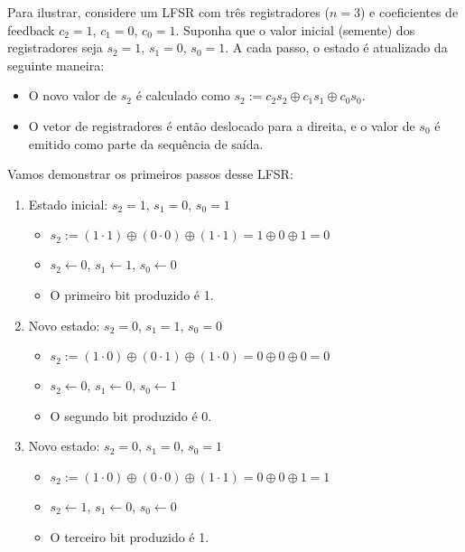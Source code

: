 \begin{example}
  Para ilustrar, considere um LFSR com três registradores ($n=3$) e coeficientes de feedback $c_2 = 1$, $c_1 = 0$, $c_0 = 1$.
  Suponha que o valor inicial (semente) dos registradores seja $s_2 = 1$, $s_1 = 0$, $s_0 = 1$.
  A cada passo, o estado é atualizado da seguinte maneira:

\begin{itemize}
    \item O novo valor de $s_2$ é calculado como $s_2 := c_2 s_2 \oplus c_1 s_1 \oplus c_0 s_0$.
    \item O vetor de registradores é então deslocado para a direita, e o valor de $s_0$ é emitido como parte da sequência de saída.
\end{itemize}

Vamos demonstrar os primeiros passos desse LFSR:

\begin{enumerate}
    \item Estado inicial: $s_2 = 1$, $s_1 = 0$, $s_0 = 1$
    \begin{itemize}
        \item $s_2 := (1 \cdot 1) \oplus (0 \cdot 0) \oplus (1 \cdot 1) = 1 \oplus 0 \oplus 1 = 0$
        \item $s_2 \leftarrow 0$, $s_1 \leftarrow 1$, $s_0 \leftarrow 0$
        \item O primeiro bit produzido é 1.
    \end{itemize}
    
    \item Novo estado: $s_2 = 0$, $s_1 = 1$, $s_0 = 0$
    \begin{itemize}
        \item $s_2 := (1 \cdot 0) \oplus (0 \cdot 1) \oplus (1 \cdot 0) = 0 \oplus 0 \oplus 0 = 0$
        \item $s_2 \leftarrow 0$, $s_1 \leftarrow 0$, $s_0 \leftarrow 1$
        \item O segundo bit produzido é 0.
    \end{itemize}
    
    \item Novo estado: $s_2 = 0$, $s_1 = 0$, $s_0 = 1$
    \begin{itemize}
        \item $s_2 := (1 \cdot 0) \oplus (0 \cdot 0) \oplus (1 \cdot 1) = 0 \oplus 0 \oplus 1 = 1$
        \item $s_2 \leftarrow 1$, $s_1 \leftarrow 0$, $s_0 \leftarrow 0$
        \item O terceiro bit produzido é 1.
    \end{itemize}
    

\end{enumerate}
\end{example}
